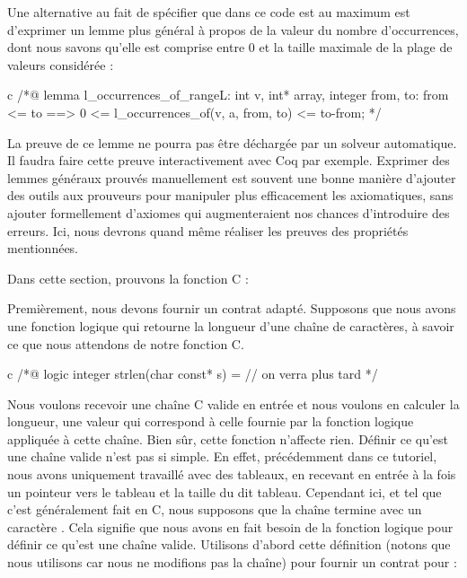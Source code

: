 Une alternative au fait de spécifier que dans ce code  est au
maximum  est d'exprimer un lemme plus général à propos de la valeur
du nombre d'occurrences, dont nous savons qu'elle est comprise entre 0 et
la taille maximale de la plage de valeurs considérée :



\begin{CodeBlock}{c}
/*@
lemma l_occurrences_of_range{L}:
  \forall int v, int* array, integer from, to:
    from <= to ==> 0 <= l_occurrences_of(v, a, from, to) <= to-from;
*/
\end{CodeBlock}



La preuve de ce lemme ne pourra pas être déchargée par un solveur automatique. Il
faudra faire cette preuve interactivement avec Coq par exemple. Exprimer des
lemmes généraux prouvés manuellement est souvent une bonne manière d'ajouter des
outils aux prouveurs pour manipuler plus efficacement les axiomatiques, sans
ajouter formellement d'axiomes qui augmenteraient nos chances d'introduire des
erreurs. Ici, nous devrons quand même réaliser les preuves des propriétés
mentionnées.




Dans cette section, prouvons la fonction C :




Premièrement, nous devons fournir un contrat adapté. Supposons que nous avons
une fonction logique  qui retourne la longueur d'une chaîne
de caractères, à savoir ce que nous attendons de notre fonction C.


\begin{CodeBlock}{c}
/*@
  logic integer strlen(char const* s) = // on verra plus tard
*/
\end{CodeBlock}


Nous voulons recevoir une chaîne C valide en entrée et nous voulons en
calculer la longueur, une valeur qui correspond à celle fournie par la
fonction logique  appliquée à cette chaîne. Bien sûr,
cette fonction n'affecte rien. Définir ce qu'est une chaîne valide n'est
pas si simple. En effet, précédemment dans ce tutoriel, nous avons uniquement
travaillé avec des tableaux, en recevant en entrée à la fois un pointeur
vers le tableau et la taille du dit tableau. Cependant ici, et tel que
c'est généralement fait en C, nous supposons que la chaîne termine avec
un caractère . Cela signifie que nous
avons en fait besoin de la fonction logique  pour
définir ce qu'est une chaîne valide. Utilisons d'abord cette définition
(notons que nous utilisons 
car nous ne modifions pas la chaîne) pour fournir un contrat pour
 :



